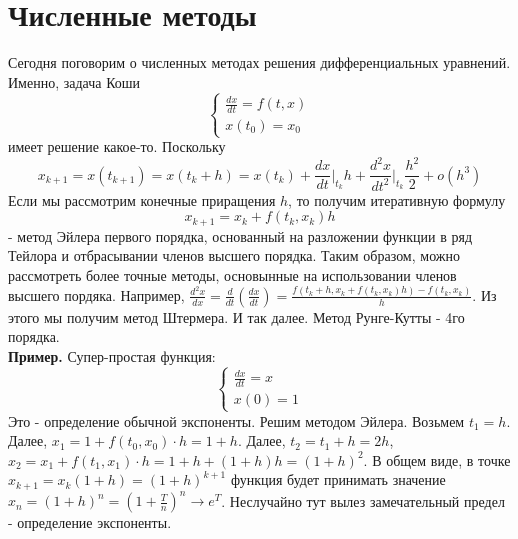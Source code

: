 \section{Численные методы}
Сегодня поговорим о численных методах решения дифференциальных уравнений.
Именно, задача Коши
$$\begin{cases}
    \frac{dx}{dt}=f(t,x)\\x(t_0)=x_0
\end{cases}$$ 
имеет решение какое-то. 
Поскольку 
$$x_{k+1}=x(t_{k+1})=x(t_k+h)=x(t_k)+\frac{dx}{dt}\big|_{t_k}h+
\frac{d^2x}{dt^2}\big|_{t_k}\frac{h^2}{2}+o(h^3)$$
Если мы рассмотрим конечные приращения $h$, то 
получим  итеративную формулу 
$$x_{k+1}=x_k+f(t_k,x_k)h$$ 
- метод Эйлера первого порядка, основанный на разложении функции в ряд Тейлора
и отбрасывании членов высшего порядка. Таким образом, можно рассмотреть
более точные методы, основынные на использовании членов высшего пордяка.
Например, $\frac{d^2x}{dx}=\frac{d}{dt}\left( \frac{dx}{dt} \right)=
\frac{f(t_k+h,x_k+f(t_k,x_k)h)-f(t_k,x_k)}{h}$. Из этого мы получим 
метод Штермера. И так далее. Метод  Рунге-Кутты - 4го порядка.\\
\textbf{Пример.} Супер-простая функция:
$$\begin{cases}
    \frac{dx}{dt}=x\\x(0)=1
\end{cases}$$
Это - определение обычной экспоненты. Решим методом Эйлера. Возьмем
$t_1=h$. Далее,  $x_1=1+f(t_0,x_0)\cdot h=1+h$. Далее,
 $t_2=t_1+h=2h$, $x_2=x_1+f(t_1,x_1)\cdot h=1+h+(1+h)h=(1+h)^2$.
 В общем виде, в точке $x_{k+1}=x_k(1+h)=(1+h)^{k+1}$ 
 функция будет принимать значение $x_n=(1+h)^{n}=\left( 1+\frac{T}{n}\right)^n
\to e^T$.
Неслучайно тут вылез замечательный предел - определение экспоненты.
